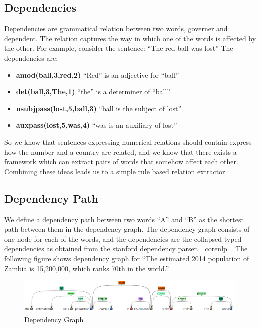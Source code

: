 \documentclass[a4paper,10pt]{article}
\begin{document}
\subsection{Dependencies}
Dependencies are grammatical relation between two words, governer and dependent.
The relation captures the way in which one of the words is affected by the other.
For example, consider the sentence:
``The red ball was lost''
The dependencies are:
\begin{itemize}

\item \textbf{amod(ball,3,red,2)} ``Red'' is an adjective for ``ball''
\item \textbf{det(ball,3,The,1)}  ``the'' is a determiner of ``ball''
\item \textbf{nsubjpass(lost,5,ball,3)}	``ball is the subject of lost''
\item \textbf{auxpass(lost,5,was,4)}	``was is an auxiliary of lost''
\end {itemize}

So we know that sentences expressing numerical relations should contain express how the number and a country
are related, and we know that there exists a framework which can extract pairs of words that somehow affect each other.
Combining these ideas leads us to a simple rule based relation extractor.

\subsection{Dependency Path}
We define a dependency path between two words ``A'' and ``B'' as the shortest path between them in the dependency graph.
The dependency graph consists of one node for each of the words, and the dependencies are the collapsed typed dependencies 
as obtained from the stanford dependency parser. [\ref{corenlp}]. 
The following figure shows dependency graph for ``The estimated 2014 population of Zambia is 15,200,000, which ranks 70th in the world.''
\begin{figure}
 \centering
 \includegraphics[bb=0 0 990 149, scale = 0.4]{./dep.png}
 \caption{Dependency Graph}
 \label{fig:1}
\end{figure}
\end{document}

